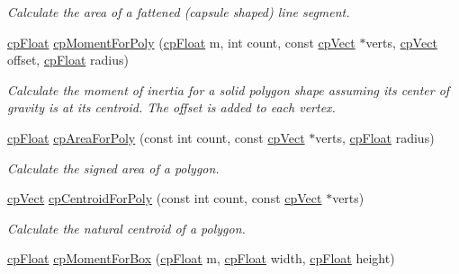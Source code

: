 \begin{DoxyCompactItemize}
\begin{DoxyCompactList}\small\item\em Calculate the area of a fattened (capsule shaped) line segment. \end{DoxyCompactList}\item 
\hypertarget{group__misc_ga07f110041cb818aa6c19e41623f5054e}{}\hyperlink{group__basic_types_gac1ed65573e035bf892505768c852d8d3}{cp\+Float} \hyperlink{group__misc_ga07f110041cb818aa6c19e41623f5054e}{cp\+Moment\+For\+Poly} (\hyperlink{group__basic_types_gac1ed65573e035bf892505768c852d8d3}{cp\+Float} m, int count, const \hyperlink{structcp_vect}{cp\+Vect} $\ast$verts, \hyperlink{structcp_vect}{cp\+Vect} offset, \hyperlink{group__basic_types_gac1ed65573e035bf892505768c852d8d3}{cp\+Float} radius)\label{group__misc_ga07f110041cb818aa6c19e41623f5054e}

\begin{DoxyCompactList}\small\item\em Calculate the moment of inertia for a solid polygon shape assuming it\textquotesingle{}s center of gravity is at it\textquotesingle{}s centroid. The offset is added to each vertex. \end{DoxyCompactList}\item 
\hyperlink{group__basic_types_gac1ed65573e035bf892505768c852d8d3}{cp\+Float} \hyperlink{group__misc_ga916a74d85ac37e3f5577adddad05a0bc}{cp\+Area\+For\+Poly} (const int count, const \hyperlink{structcp_vect}{cp\+Vect} $\ast$verts, \hyperlink{group__basic_types_gac1ed65573e035bf892505768c852d8d3}{cp\+Float} radius)
\begin{DoxyCompactList}\small\item\em Calculate the signed area of a polygon. \end{DoxyCompactList}\item 
\hypertarget{group__misc_gaaeaa99c27ff452c3bb957cf3d82d4f64}{}\hyperlink{structcp_vect}{cp\+Vect} \hyperlink{group__misc_gaaeaa99c27ff452c3bb957cf3d82d4f64}{cp\+Centroid\+For\+Poly} (const int count, const \hyperlink{structcp_vect}{cp\+Vect} $\ast$verts)\label{group__misc_gaaeaa99c27ff452c3bb957cf3d82d4f64}

\begin{DoxyCompactList}\small\item\em Calculate the natural centroid of a polygon. \end{DoxyCompactList}\item 
\hypertarget{group__misc_gaf7b38a68ad64e02f7542eaab640e6743}{}\hyperlink{group__basic_types_gac1ed65573e035bf892505768c852d8d3}{cp\+Float} \hyperlink{group__misc_gaf7b38a68ad64e02f7542eaab640e6743}{cp\+Moment\+For\+Box} (\hyperlink{group__basic_types_gac1ed65573e035bf892505768c852d8d3}{cp\+Float} m, \hyperlink{group__basic_types_gac1ed65573e035bf892505768c852d8d3}{cp\+Float} width, \hyperlink{group__basic_types_gac1ed65573e035bf892505768c852d8d3}{cp\+Float} height)\label{group__misc_gaf7b38a68ad64e02f7542eaab640e6743}


\end{DoxyCompactItemize}
